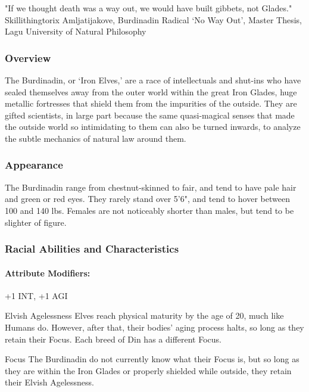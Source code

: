 \documentclass[oneside,11pt,english]{book}
\begin{document}
 

"If we thought death was a way out, we would have built gibbets, not Glades." 
Skillithingtorix Amljatijakove, Burdinadin Radical 
‘No Way Out’, Master Thesis, Lagu University of Natural Philosophy 

 

\subsubsection*{Overview} 
The Burdinadin, or ‘Iron Elves,’ are a race of intellectuals and shut-ins who have sealed themselves away 
from the outer world within the great Iron Glades, huge metallic fortresses that shield them from the 
impurities of the outside. They are gifted scientists, in large part because the same quasi-magical senses 
that made the outside world so intimidating to them can also be turned inwards, to analyze the subtle 
mechanics of natural law around them. 

 

\subsubsection*{Appearance} 
The Burdinadin range from chestnut-skinned to fair, and tend to have pale hair and green or red eyes. 
They rarely stand over 5'6", and tend to hover between 100 and 140 lbs. Females are not noticeably 
shorter than males, but tend to be slighter of figure. 

 

\subsubsection*{Racial Abilities and Characteristics} 
\paragraph{Attribute Modifiers:} +1 INT, +1 AGI 

 

Elvish Agelessness 
Elves reach physical maturity by the age of 20, much like Humans do. However, after that, their 
bodies' aging process halts, so long as they retain their Focus. Each breed of Din has a different 
Focus. 

 

Focus 
The Burdinadin do not currently know what their Focus is, but so long as they are within the Iron 
Glades or properly shielded while outside, they retain their Elvish Agelessness. 
\end{document}
